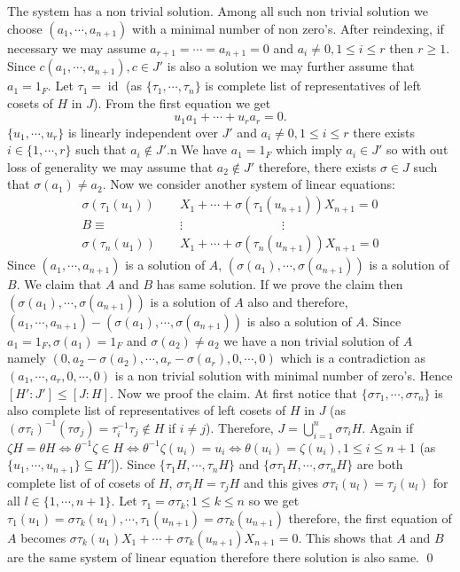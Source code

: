 \documentclass[11pt]{amsart}
\DeclareMathOperator{\id}{\text{id}}
\begin{document}
The system has a non trivial solution. Among all such non trivial solution we choose $(a_1,\cdots,a_{n+1})$ with a minimal number of non zero's. After reindexing, if necessary we may assume $a_{r+1}=\cdots=a_{n+1}=0$ and $a_i\neq 0,1\leq i\leq r$ then $r\geq 1.$ Since $c(a_1,\cdots,a_{n+1}),c\in J'$ is also a solution we may further assume that $a_1=1_F.$ Let $\tau_1=\id$ (as $\{\tau_1,\cdots,\tau_n\}$ is complete list of representatives of left cosets of $H$ in $J$). From the first equation we get $$u_1a_1+\cdots+u_ra_r=0.$$
$\{u_1,\cdots,u_r\}$ is linearly independent over $J'$ and $a_i\neq 0,1\leq i\leq r$ there exists $i\in \{1,\cdots,r\}$ such that $a_i\notin J'.$n We have $a_1=1_F$ which imply $a_i\in J'$ so with out loss of generality we may assume that $a_2\notin J'$ therefore, there exists $\sigma\in J$ such that $\sigma(a_1)\neq a_2$. Now we consider another system of linear equations:
\begin{align*}
\sigma(\tau_1(u_1))&X_1+\cdots+\sigma(\tau_1(u_{n+1}))X_{n+1}=0\\
B\equiv\quad\qquad\qquad&\vdots \qquad\qquad\qquad\qquad \vdots\\
\sigma(\tau_n(u_1))&X_1+\cdots+\sigma(\tau_n(u_{n+1}))X_{n+1}=0
\end{align*}
Since $(a_1,\cdots,a_{n+1})$ is a solution of $A$, $(\sigma(a_1),\cdots,\sigma(a_{n+1}))$ is a solution of $B.$ We claim that $A$ and $B$ has same solution. If we prove the claim then $(\sigma(a_1),\cdots,\sigma(a_{n+1}))$ is a solution of $A$ also and therefore, $(a_1,\cdots,a_{n+1})-(\sigma(a_1),\cdots,\sigma(a_{n+1}))$ is also a solution of $A$. Since $a_1=1_F,\sigma(a_1)=1_F$ and $\sigma(a_2)\neq a_2$ we have a non trivial solution of $A$ namely $(0,a_2-\sigma(a_2),\cdots,a_r-\sigma(a_r),0,\cdots,0)$ which is a contradiction as $(a_1,\cdots,a_r,0,\cdots,0)$ is a non trivial solution with minimal number of zero's. Hence $[H':J']\leq [J:H].$ Now we proof the claim. At first notice that $\{\sigma\tau_1,\cdots,\sigma\tau_n\}$ is also complete list of representatives of left cosets of $H$ in $J$ (as $(\sigma\tau_i)^{-1}(\tau\sigma_j)=\tau_i^{-1}\tau_j\notin H$ if $i\neq j$). Therefore, $J=\displaystyle\bigcup_{i=1}^n \sigma\tau_iH.$ Again if $\zeta H=\theta H\Leftrightarrow \theta^{-1}\zeta\in H \Leftrightarrow \theta^{-1}\zeta(u_i)=u_i \Leftrightarrow \theta(u_i)=\zeta(u_i),1\leq i\leq n+1$ (as $\{u_1,\cdots,u_{n+1}\}\subseteq H']$). Since $\{\tau_1H,\cdots,\tau_nH\}$ and $\{\sigma\tau_1H,\cdots,\sigma\tau_nH\}$ are both complete list of of cosets of $H$, $\sigma\tau_iH=\tau_jH$ and this gives $\sigma\tau_i(u_l)=\tau_j(u_l)$ for all $l\in\{1,\cdots,n+1\}.$ Let $\tau_1=\sigma\tau_k;1\leq k\leq n$ so we get $\tau_1(u_1)=\sigma\tau_k(u_1),\cdots,\tau_1(u_{n+1})=\sigma\tau_k(u_{n+1})$ therefore, the first equation of $A$ becomes $\sigma\tau_k(u_1)X_1+\cdots+\sigma\tau_k(u_{n+1})X_{n+1}=0$. This shows that $A$ and $B$ are the same system of linear equation therefore there solution is also same. \qed
\end{document}

